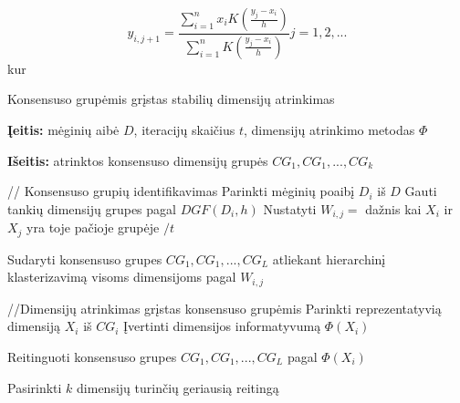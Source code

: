 \begin{equation}
\label{for_dgf}
  y_{i, j+1}=\frac{\sum_{i=1}^{n} x_i K(\frac{y_j - x_i}{h})}{\sum_{i=1}^{n} K(\frac{y_j - x_i}{h})} j=1,2,...
\end{equation}
kur

\begin{algorithm}
 \caption{Konsensuso grupėmis grįstas stabilių dimensijų atrinkimas}
 \label{CGS}
 \begin{algorithmic}
   \item \textbf{Įeitis:} mėginių aibė $D$, iteracijų skaičius $t$, dimensijų atrinkimo metodas $\Phi$\
   \item \textbf{Išeitis:} atrinktos konsensuso dimensijų grupės $CG_1, CG_1,..., CG_k$
   \item // Konsensuso grupių identifikavimas
    \State Parinkti mėginių  poaibį $D_i$ iš $D$
    \State Gauti tankių dimensijų grupes pagal $DGF(D_i, h)$
   \EndFor
    \State Nustatyti $W_{i,j}=$ dažnis kai $X_i$ ir $X_j$ yra toje pačioje grupėje $/t$
   \EndFor
   \item Sudaryti konsensuso grupes $CG_1, CG_1,..., CG_L$ atliekant hierarchinį klasterizavimą visoms dimensijoms pagal $W_{i, j}$
   \item //Dimensijų atrinkimas grįstas konsensuso grupėmis
    \State Parinkti reprezentatyvią dimensiją $X_i$ iš $CG_i$
    \State Įvertinti dimensijos informatyvumą $\Phi(X_i)$
   \EndFor
   \item Reitinguoti konsensuso grupes $CG_1, CG_1,..., CG_L$ pagal $\Phi(X_i)$
   \item Pasirinkti $k$ dimensijų turinčių geriausią reitingą  
 \end{algorithmic}
\end{algorithm}
